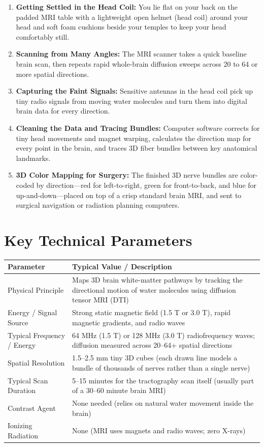 \begin{enumerate}
    \item \textbf{Getting Settled in the Head Coil:} You lie flat on your back on the padded MRI table with a lightweight open helmet (head coil) around your head and soft foam cushions beside your temples to keep your head comfortably still.
    \item \textbf{Scanning from Many Angles:} The MRI scanner takes a quick baseline brain scan, then repeats rapid whole-brain diffusion sweeps across 20 to 64 or more spatial directions.
    \item \textbf{Capturing the Faint Signals:} Sensitive antennas in the head coil pick up tiny radio signals from moving water molecules and turn them into digital brain data for every direction.
    \item \textbf{Cleaning the Data and Tracing Bundles:} Computer software corrects for tiny head movements and magnet warping, calculates the direction map for every point in the brain, and traces 3D fiber bundles between key anatomical landmarks.
    \item \textbf{3D Color Mapping for Surgery:} The finished 3D nerve bundles are color-coded by direction---red for left-to-right, green for front-to-back, and blue for up-and-down---placed on top of a crisp standard brain MRI, and sent to surgical navigation or radiation planning computers.
\end{enumerate}

\section{Key Technical Parameters}

\noindent\begin{tabularx}{\textwidth}{@{}l X@{}}
\toprule
\textbf{Parameter} & \textbf{Typical Value / Description} \\
\midrule
Physical Principle & Maps 3D brain white-matter pathways by tracking the directional motion of water molecules using diffusion tensor MRI (DTI) \\
Energy / Signal Source & Strong static magnetic field (1.5 T or 3.0 T), rapid magnetic gradients, and radio waves \\
Typical Frequency / Energy & 64 MHz (1.5 T) or 128 MHz (3.0 T) radiofrequency waves; diffusion measured across 20--64+ spatial directions \\
Spatial Resolution & 1.5--2.5 mm tiny 3D cubes (each drawn line models a bundle of thousands of nerves rather than a single nerve) \\
Typical Scan Duration & 5--15 minutes for the tractography scan itself (usually part of a 30--60 minute brain MRI) \\
Contrast Agent & None needed (relies on natural water movement inside the brain) \\
Ionizing Radiation & None (MRI uses magnets and radio waves; zero X-rays) \\
\bottomrule
\end{tabularx}

